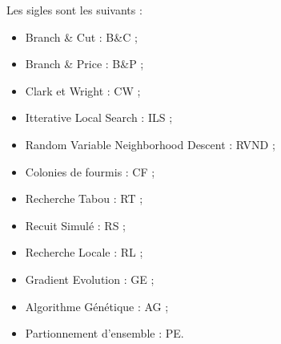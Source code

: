 Les sigles sont les suivants :
\begin{itemize}[label=$\square$]
\item Branch \& Cut : B\&C ;
\item Branch \& Price : B\&P ;
\item Clark et Wright : CW ;
\item Itterative Local Search : ILS ;
\item Random Variable Neighborhood Descent : RVND ;
\item Colonies de fourmis : CF ;
\item Recherche Tabou : RT ;
\item Recuit Simulé : RS ;
\item Recherche Locale : RL ;
\item Gradient Evolution : GE ;
\item Algorithme Génétique : AG ;
\item Partionnement d'ensemble : PE.
\end{itemize}

